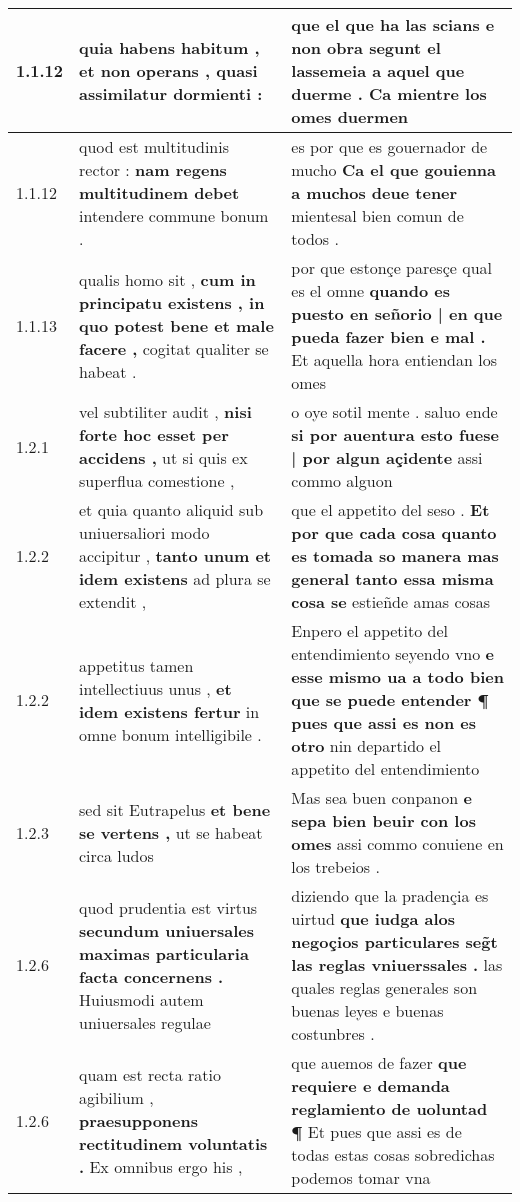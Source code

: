 \begin{tabular}{|p{1cm}|p{6.5cm}|p{6.5cm}|}
1.1.12 & quia habens habitum , \textbf{ et non operans , } quasi assimilatur dormienti : & que el que ha las scians \textbf{ e non obra segunt el lassemeia a aquel que duerme . } Ca mientre los omes duermen \\\hline
1.1.12 & quod est multitudinis rector : \textbf{ nam regens multitudinem debet } intendere commune bonum . & es por que es gouernador de mucho \textbf{ Ca el que gouienna a muchos deue tener } mientesal bien comun de todos . \\\hline
1.1.13 & qualis homo sit , \textbf{ cum in principatu existens , in quo potest bene et male facere , } cogitat qualiter se habeat . & por que estonçe paresçe qual es el omne \textbf{ quando es puesto en señorio | en que pueda fazer bien e mal . } Et aquella hora entiendan los omes \\\hline
1.2.1 & vel subtiliter audit , \textbf{ nisi forte hoc esset per accidens , } ut si quis ex superflua comestione , & o oye sotil mente . saluo ende \textbf{ si por auentura esto fuese | por algun açidente } assi commo alguon \\\hline
1.2.2 & et quia quanto aliquid sub uniuersaliori modo accipitur , \textbf{ tanto unum et idem existens } ad plura se extendit , & que el appetito del seso . \textbf{ Et por que cada cosa quanto es tomada so manera mas general tanto essa misma cosa se } estieñde amas cosas \\\hline
1.2.2 & appetitus tamen intellectiuus unus , \textbf{ et idem existens fertur } in omne bonum intelligibile . & Enpero el appetito del entendimiento seyendo vno \textbf{ e esse mismo ua a todo bien que se puede entender ¶ pues que assi es non es otro } nin departido el appetito del entendimiento \\\hline
1.2.3 & sed sit Eutrapelus \textbf{ et bene se vertens , } ut se habeat circa ludos & Mas sea buen conpanon \textbf{ e sepa bien beuir con los omes } assi commo conuiene en los trebeios . \\\hline
1.2.6 & quod prudentia est virtus \textbf{ secundum uniuersales maximas particularia facta concernens . } Huiusmodi autem uniuersales regulae & diziendo que la pradençia es uirtud \textbf{ que iudga alos negoçios particulares seg̃t las reglas vniuerssales . } las quales reglas generales son buenas leyes e buenas costunbres . \\\hline
1.2.6 & quam est recta ratio agibilium , \textbf{ praesupponens rectitudinem voluntatis . } Ex omnibus ergo his , & que auemos de fazer \textbf{ que requiere e demanda reglamiento de uoluntad ¶ } Et pues que assi es de todas estas cosas sobredichas podemos tomar vna \\\hline

\end{tabular}

